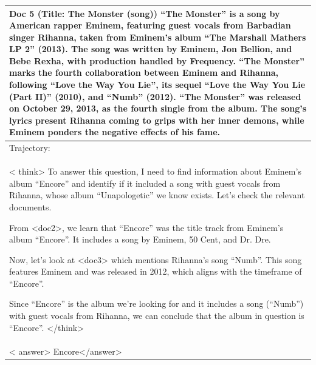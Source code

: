 \documentclass[11pt]{article}
\begin{document}
\begin{longtable}{|p{}|}
Doc 5 (Title: The Monster (song)) ``The Monster'' is a song by American rapper Eminem, featuring guest vocals from Barbadian singer Rihanna, taken from Eminem's album ``The Marshall Mathers LP 2'' (2013). The song was written by Eminem, Jon Bellion, and Bebe Rexha, with production handled by Frequency. ``The Monster'' marks the fourth collaboration between Eminem and Rihanna, following ``Love the Way You Lie'', its sequel ``Love the Way You Lie (Part II)'' (2010), and ``Numb'' (2012). ``The Monster'' was released on October 29, 2013, as the fourth single from the album. The song's lyrics present Rihanna coming to grips with her inner demons, while Eminem ponders the negative effects of his fame.\\
\hline
Trajectory: \\
\textless{} think\textgreater{} 
To answer this question, I need to find information about Eminem's album ``Encore'' and identify if it included a song with guest vocals from Rihanna, whose album ``Unapologetic'' we know exists. Let's check the relevant documents.

From <doc2>, we learn that ``Encore'' was the title track from Eminem's album ``Encore''. It includes a song by Eminem, 50 Cent, and Dr. Dre. 

Now, let's look at <doc3> which mentions Rihanna's song ``Numb''. This song features Eminem and was released in 2012, which aligns with the timeframe of ``Encore''.

Since ``Encore'' is the album we're looking for and it includes a song (``Numb'') with guest vocals from Rihanna, we can conclude that the album in question is ``Encore''.
\textless{}/think\textgreater{} \\
\hline
\textless{} answer\textgreater{} Encore\textless{}/answer\textgreater{} \\
\end{longtable}
\end{document}

